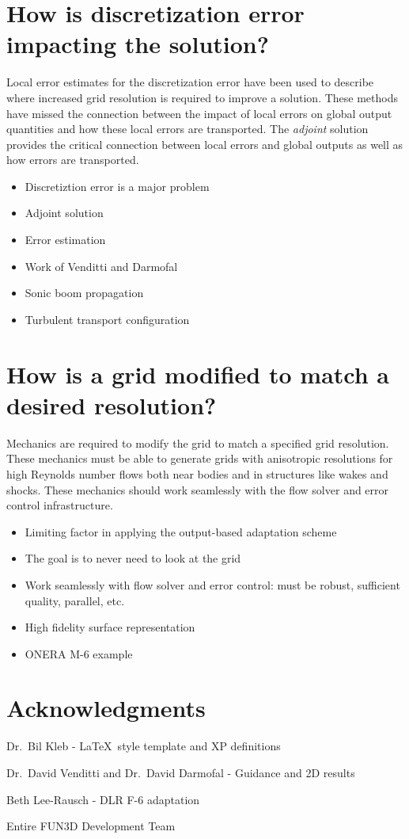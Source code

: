 \documentclass[twocolumn]{article}
\newenvironment{itemiz}%
  {\begin{list}{}{\raggedright
      \setlength{\itemsep}{2pt}%
      \setlength{\parskip}{4pt}\setlength{\parsep}{2pt}}}%
  {\end{list}}%
\begin{document}
  \section{How is discretization error impacting the solution?}
  Local error estimates for the discretization error have been used to
  describe where increased grid resolution is required to improve a
  solution. These methods have missed the connection between the
  impact of local errors on global output quantities and how these
  local errors are transported. The \emph{adjoint} solution provides
  the critical connection between local errors and global outputs as
  well as how errors are transported.

  \begin{itemize}
  \item Discretiztion error is a major problem
  \item Adjoint solution
  \item Error estimation
  \item Work of Venditti and Darmofal
  \item Sonic boom propagation
  \item Turbulent transport configuration
  \end{itemize}
 
  \section{How is a grid modified to match a desired resolution?}
  Mechanics are required to modify the grid to match a specified grid
  resolution. These mechanics must be able to generate grids with
  anisotropic resolutions for high Reynolds number flows both near
  bodies and in structures like wakes and shocks. These mechanics
  should work seamlessly with the flow solver and error control
  infrastructure.

  \begin{itemize}
  \item Limiting factor in applying the output-based adaptation scheme
  \item The goal is to never need to look at the grid
  \item Work seamlessly with flow solver and error control: must be
  robust, sufficient quality, parallel, etc.
  \item High fidelity surface representation
  \item ONERA M-6 example
  \end{itemize}
 
  \section{Acknowledgments}
  \begin{itemiz}
  \item Dr.~Bil Kleb - \LaTeX~style template and XP definitions 
  \item Dr.~David Venditti and Dr.~David Darmofal - Guidance and 2D results
  \item Beth Lee-Rausch - DLR F-6 adaptation
  \item Entire FUN3D Development Team
  \end{itemiz}
\end{document}
